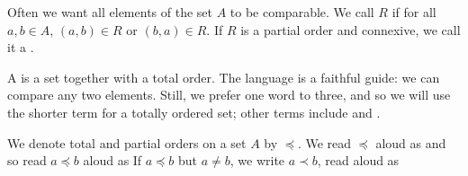Often we want all elements of the set $A$ to be comparable.
We call $R$  if for all $a, b \in A$, $(a, b) \in R$ or $(b, a) \in R$.
If $R$ is a partial order and connexive, we call it a .


A  is a set together with a total order.
The language is a faithful guide: we can compare any two elements.
Still, we prefer one word to three, and so we will use the shorter term  for a totally ordered set; other terms include  and .

We denote total and partial orders on a set $A$ by $\preceq$.
We read $\preceq$ aloud as  and so read $a\preceq b$ aloud as 
If $a \preceq b$ but $a \neq b$, we write $a \prec b$, read aloud as 

\strats
